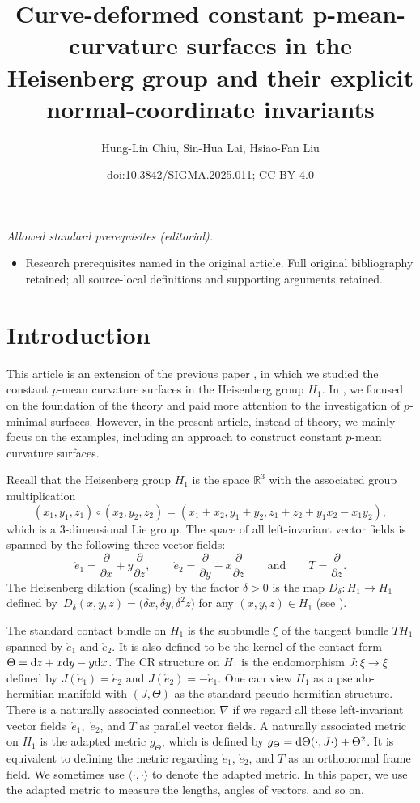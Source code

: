 \documentclass[10pt,a4paper]{amsart}
\title{Curve-deformed constant p-mean-curvature surfaces in the Heisenberg group and their explicit normal-coordinate invariants}
\author{Hung-Lin Chiu, Sin-Hua Lai, Hsiao-Fan Liu}
\date{doi:10.3842/SIGMA.2025.011; CC BY 4.0}
\numberwithin{equation}{section}
\begin{document}
\maketitle
\noindent\textit{Allowed standard prerequisites (editorial).}\begin{itemize}
\item Research prerequisites named in the original article. Full original bibliography retained; all source-local definitions and supporting arguments retained.
\end{itemize}\medskip
\section{Introduction}
This article is an extension of the previous paper \cite{ChiuH/LiuH:2022}, in which we studied the constant $p$-mean curvature surfaces in the Heisenberg group $H_{1}$. In \cite{ChiuH/LiuH:2022}, we focused on the foundation of the theory and paid more attention to the investigation of $p$-minimal surfaces. However, in the present article, instead of theory, we mainly focus on the examples, including an approach to construct constant $p$-mean curvature surfaces.

Recall that the Heisenberg group $H_1$ is the space $\mathbb{R}^3$ with the associated group multiplication%
\[(x_1,y_1,z_1)\circ (x_2,y_2,z_2)
=(x_1+x_2,y_1+y_2, z_1+z_2+y_1x_2-x_1y_2),\]
which is a $3$-dimensional Lie group. The space of all
left-invariant vector fields is spanned by the following three vector fields:
\[\mathring{e}_1=\frac{\partial}{\partial x}+y\frac{\partial}{\partial z},\qquad
\mathring{e}_2=\frac{\partial}{\partial y}-x\frac{\partial}{\partial z}
\qquad\text{and}\qquad T=\frac{\partial}{\partial z}.\]
The Heisenberg dilation (scaling) by the factor $\delta>0$ is the map $D_\delta\colon H_1\rightarrow H_1$ defined by~${D_\delta(x,y,z)=\bigl(\delta x,\delta y,\delta^2 z\bigr)}$ for any $(x,y,z)\in H_1$ (see \cite{Dragomir/Tomassini:2006}).

The standard contact bundle on $H_1$ is the subbundle $\xi$ of the tangent bundle
$TH_1$ spanned by $\mathring{e}_1$ and $\mathring{e}_2$. It is also defined to be the kernel of
the contact form
$\Theta={\rm d}z+x{\rm d}y-y{\rm d}x$.
The CR structure on $H_1$ is the endomorphism $J\colon \xi\to \xi$ defined by
$J(\mathring{e}_1)=\mathring{e}_2$ and $J(\mathring{e}_2)=-\mathring{e}_1$.
One can view $H_1$ as a pseudo-hermitian manifold
with $(J,\Theta)$ as the standard pseudo-hermitian structure. There is a naturally associated connection $\nabla$ if we regard all these left-invariant vector fields~$\mathring{e}_1$,~$\mathring{e}_2$, and $T$ as parallel vector fields.
A naturally associated metric on $H_{1}$ is the adapted metric $g_{\Theta}$, which is defined by $g_{\Theta}={\rm d}\Theta(\cdot,J\cdot)+\Theta^{2}$. It is equivalent to defining the metric regarding $\mathring{e}_1$, $\mathring{e}_2$, and $T$ as an orthonormal frame field. We sometimes use $\langle \cdot,\cdot\rangle$ to denote the adapted metric. In this paper, we use the adapted metric to measure the lengths, angles of vectors, and so on.
\end{document}
